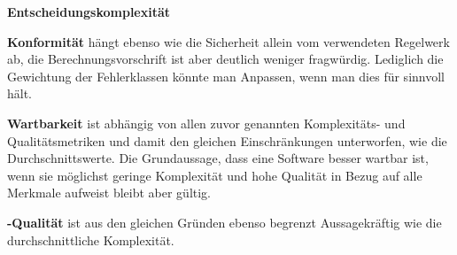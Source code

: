 \documentclass[gb,ngerman]{stthesis}
\begin{document}
\begin{labeling}{\textbf{Entscheidungskomplexität}}
				\item[\textbf{Konformität}] hängt ebenso wie die Sicherheit allein vom verwendeten Regelwerk ab, die Berechnungsvorschrift ist aber deutlich weniger fragwürdig. Lediglich die Gewichtung der Fehlerklassen könnte man Anpassen, wenn man dies für sinnvoll hält.
				\item[\textbf{Wartbarkeit}] ist abhängig von allen zuvor genannten Komplexitäts- und Qualitätsmetriken und damit den gleichen Einschränkungen unterworfen, wie die Durchschnittswerte. Die Grundaussage, dass eine Software besser wartbar ist, wenn sie möglichst geringe Komplexität und hohe Qualität in Bezug auf alle Merkmale aufweist bleibt aber gültig.
				\item[\textbf{\diameter -Qualität}] ist aus den gleichen Gründen ebenso begrenzt Aussagekräftig wie die durchschnittliche Komplexität.
			\end{labeling} 
\end{document}

